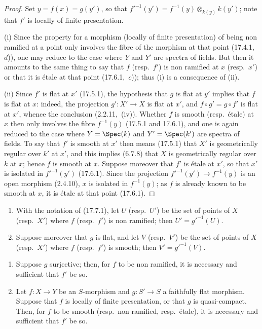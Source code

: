 \begin{proof}
Set $y=f(x)=g(y')$, so that $f'^{-1}(y')=f^{-1}(y)\otimes_{k(y)}k(y')$; note that $f'$ is locally of finite presentation.

(i) Since the property for a morphism (locally of finite presentation) of being non ramified at a point only involves the fibre of the morphism at that point (17.4.1,~$d$)), one may reduce to the case where $Y$ and $Y'$ are spectra of fields.
But then it amounts to the same thing to say that $f$ (resp.\ $f'$) is non ramified at $x$ (resp.\ $x'$) or that it is \'etale at that point (17.6.1,~$c$)); thus (i) is a consequence of (ii).

(ii) Since $f'$ is flat at $x'$ (17.5.1), the hypothesis that $g$ is flat at $y'$ implies that $f$ is flat at $x$: indeed, the projection $g':X'\to X$ is flat at $x'$, and $f\circ g'=g\circ f'$ is flat at $x'$, whence the conclusion (2.2.11,~(iv)).
Whether $f$ is smooth (resp.\ \'etale) at $x$ then only involves the fibre $f^{-1}(y)$ (17.5.1 and 17.6.1), and one is again reduced to the case where $Y=\Spec(k)$ and $Y'=\Spec(k')$ are spectra of fields.
To say that $f'$ is smooth at $x'$ then means (17.5.1) that $X'$ is geometrically regular over $k'$ at $x'$, and this implies (6.7.8) that $X$ is geometrically regular over $k$ at $x$; hence $f$ is smooth at $x$.
Suppose moreover that $f'$ is \'etale at $x'$, so that $x'$ is isolated in $f'^{-1}(y')$ (17.6.1).
Since the projection $f'^{-1}(y')\to f^{-1}(y)$ is an open morphism (2.4.10), $x$ is isolated in $f^{-1}(y)$; as $f$ is already known to be smooth at $x$, it is \'etale at that point (17.6.1).
\end{proof}

\begin{corollary}[17.7.2]
\label{IV.17.7.2}
\begin{enumerate}[label=(\roman*)]
  \item With the notation of (17.7.1), let $U$ (resp.\ $U'$) be the set of points of $X$ (resp.\ $X'$) where $f$ (resp.\ $f'$) is non ramified; then $U'=g'^{-1}(U)$.
  \item Suppose moreover that $g$ is flat, and let $V$ (resp.\ $V'$) be the set of points of $X$ (resp.\ $X'$) where $f$ (resp.\ $f'$) is smooth; then $V'=g'^{-1}(V)$.
\end{enumerate}
\end{corollary}

\begin{corollary}[17.7.3]
\label{IV.17.7.3}
\begin{enumerate}[label=(\roman*)]
  \item Suppose $g$ surjective; then, for $f$ to be non ramified, it is necessary and sufficient that $f'$ be so.
  \item Let $f:X\to Y$ be an $S$-morphism and $g:S'\to S$ a faithfully flat morphism.
  Suppose that $f$ is locally of finite presentation, or that $g$ is quasi-compact.
  Then, for $f$ to be smooth (resp.\ non ramified, resp.\ \'etale), it is necessary and sufficient that $f'$ be so.
\end{enumerate}
\end{corollary}


